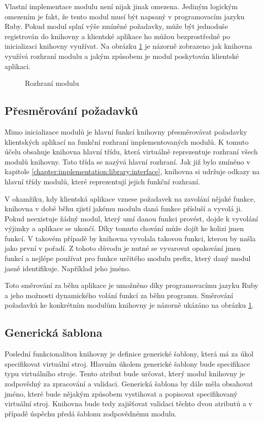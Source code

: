 Vlastní implementace modulu není nijak jinak omezena. Jediným logickým omezením je fakt, že tento modul musí být napsaný
v programovacím jazyku Ruby. Pokud modul splní výše zmíněné požadavky, může být jednoduše registrován do knihovny a klientské
aplikace ho můžou bezprostředně po inicializaci knihovny využívat. Na obrázku \ref{module:interface} je názorně zobrazeno 
jak knihovna využívá rozhraní modulu a jakým způsobem je modul poskytován klientské aplikaci.
\begin{figure}
    \centering    
    \caption{Rozhraní modulu}
    \label{module:interface}
\end{figure}
\subsection{Přesměrování požadavků}
\label{chapter:implementation:library:routing}
Mimo inicializace modulů je hlavní funkcí knihovny přesměrovávat požadavky klientských aplikací na funkční rozhraní 
implementovaných modulů. K tomuto účelu obsahuje knihovna hlavní třídu, která virtuálně reprezentuje rozhraní všech modulů
knihovny. Tato třída se nazývá hlavní rozhraní. Jak již bylo zmíněno v kapitole \ref{chapter:implementation:library:interface},
knihovna si udržuje odkazy na hlavní třídy modulů, které reprezentují jejich funkční rozhraní.

V okamžiku, kdy klientská aplikace vznese požadavek na zavolání nějaké funkce, knihovna v době běhu zjistí jakému modulu daná
funkce přísluší a vyvolá ji. Pokud neexistuje žádný modul, který umí danou funkci provést, dojde k vyvolání výjimky a aplikace
se ukončí. Díky tomuto chování může dojít ke kolizi jmen funkcí. V takovém případě by knihovna vyvolala takovou funkci, kterou
by našla jako první v pořadí. Z tohoto důvodu je nutné se vyvarovat opakování jmen funkcí a nejlépe používat pro funkce určitého
modulu prefix, který daný modul jasně identifikuje. Například jeho jméno.

Toto směrování za běhu aplikace je umožněno díky programovacímu jazyku Ruby a jeho možnosti dynamického volání funkcí za běhu
programu. Směrování požadavků ke konkrétním modulům knihovny je názorně ukázáno na obrázku \ref{module:interface}.
\subsection{Generická šablona}
\label{chapter:implementation:library:generic}
Poslední funkcionalitou knihovny je definice generické šablony, která má za úkol specifikovat virtuální stroj. Hlavním úkolem
generické šablony bude specifikace typu virtuálního stroje. Tento atribut bude určovat, který modul knihovny je zodpovědný
za zpracování a validaci. Generická šablona by dále měla obsahovat jméno, které bude nějakým způsobem vystihovat a popisovat
specifikovaný virtuální stroj. Knihovna bude tedy zajišťovat validaci těchto dvou atributů a v případě úspěchu předá
šablonu zodpovědnému modulu.

